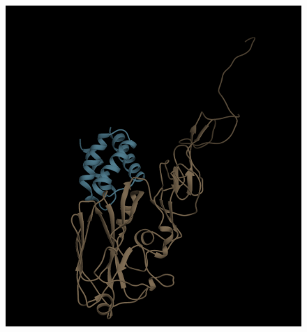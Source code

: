 \documentclass{article}
\begin{document}
\begin{figure}
\begin{minipage}{.50\textwidth}
  \centering
  \includegraphics[width=.9\linewidth]{t50_decoy}
  \label{fig:test2}
\end{minipage}

\end{figure}
\end{document}
